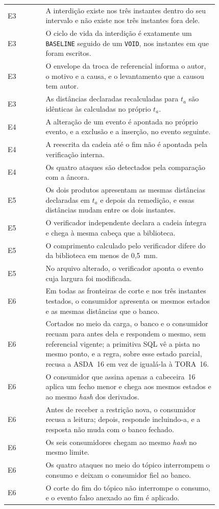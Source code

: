 \begin{longtable}{l p{0.82\linewidth}}
    E3 & A interdição existe nos três instantes dentro do seu intervalo e não existe nos três instantes fora dele. \\
    E3 & O ciclo de vida da interdição é exatamente um \texttt{BASELINE} seguido de um \texttt{VOID}, nos instantes em que foram escritos. \\
    E3 & O envelope da troca de referencial informa o autor, o motivo e a causa, e o levantamento que a causou tem autor. \\
    E3 & As distâncias declaradas recalculadas para $t_a$ são idênticas às calculadas no próprio $t_a$. \\
    \midrule
    E4 & A alteração de um evento é apontada no próprio evento, e a exclusão e a inserção, no evento seguinte. \\
    E4 & A reescrita da cadeia até o fim não é apontada pela verificação interna. \\
    E4 & Os quatro ataques são detectados pela comparação com a âncora. \\
    \midrule
    E5 & Os dois produtos apresentam as mesmas distâncias declaradas em $t_a$ e depois da remedição, e essas distâncias mudam entre os dois instantes. \\
    E5 & O verificador independente declara a cadeia íntegra e chega à mesma cabeça que a biblioteca. \\
    E5 & O comprimento calculado pelo verificador difere do da biblioteca em menos de 0,5~mm. \\
    E5 & No arquivo alterado, o verificador aponta o evento cuja largura foi modificada. \\
    \midrule
    E6 & Em todas as fronteiras de corte e nos três instantes testados, o consumidor apresenta os mesmos estados e as mesmas distâncias que o banco. \\
    E6 & Cortados no meio da carga, o banco e o consumidor recuam para antes dela e respondem o mesmo, sem referencial vigente; a primitiva SQL vê a pista no mesmo ponto, e a regra, sobre esse estado parcial, recusa a ASDA~16 em vez de igualá-la à TORA~16. \\
    E6 & O consumidor que assina apenas a cabeceira~16 aplica um fecho menor e chega aos mesmos estados e ao mesmo \textit{hash} dos derivados. \\
    E6 & Antes de receber a restrição nova, o consumidor recusa a leitura; depois, responde incluindo-a, e a resposta não muda com o banco fechado. \\
    E6 & Os seis consumidores chegam ao mesmo \textit{hash} no mesmo limite. \\
    E6 & Os quatro ataques no meio do tópico interrompem o consumo e deixam o consumidor fiel ao banco. \\
    E6 & O corte do fim do tópico não interrompe o consumo, e o evento falso anexado ao fim é aplicado. \\
\end{longtable}
